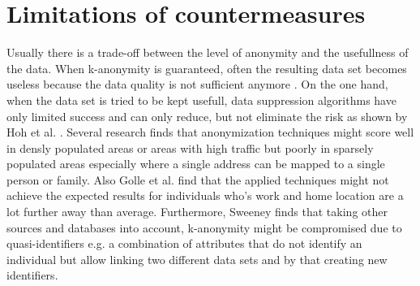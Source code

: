 \section{Limitations of countermeasures}
Usually there is a trade-off between the level of anonymity and the usefullness of the data. When k-anonymity is guaranteed, often the resulting data set becomes useless because the data quality is not sufficient anymore \parencite{krumm, cellphone, k-anonymity-old, k-anonymity, k-anonymity-achieving}.
On the one hand, when the data set is tried to be kept usefull, data suppression algorithms have only limited success and can only reduce, but not eliminate the risk as shown by Hoh et al. \parencite{hoh2006enhancing}. Several research \parencite{time-to-confusion, location-privacy, hoh2006enhancing} finds that anonymization techniques might score well in densly populated areas or areas with high traffic but poorly in sparsely populated areas especially where a single address can be mapped to a single person or family. Also Golle et al. \parencite{privacy-home-work-pairs} find that the applied techniques might not achieve the expected results for individuals who's work and home location are a lot further away than average.
Furthermore, Sweeney \parencite{k-anonymity-achieving} finds that taking other sources and databases into account, k-anonymity might be compromised due to quasi-identifiers e.g. a combination of attributes that do not identify an individual but allow linking two different data sets and by that creating new identifiers.



